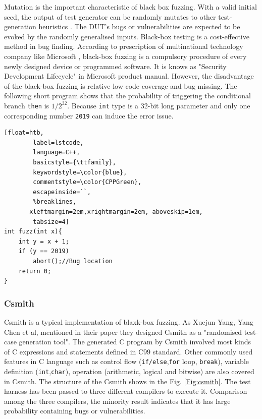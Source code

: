 Mutation is the important characteristic of black box fuzzing. With a valid initial seed, the output of test generator can be randomly mutates to other test-generation heuristics \cite{bounimova2013billions}. The DUT's bugs or vulnerabilities are expected to be evoked by the randomly generalised inputs. Black-box testing is a cost-effective method in bug finding. According to prescription of multinational technology company like Microsoft \cite{bounimova2013billions}, black-box fuzzing is a compulsory procedure of every newly designed device or programmed software. It is knows as "Security Development Lifecycle" \cite{howard2006security} in Microsoft product manual. However, the disadvantage of the black-box fuzzing is relative low code coverage and bug missing. The following short program shows that the probability of triggering the conditional branch \texttt{then} is $1/2^{32}$. Because \texttt{int} type is a 32-bit long parameter and only one corresponding number \texttt{2019} can induce the error issue.

\begin{lstlisting}[float=htb,
        label=lstcode,
        language=C++,
        basicstyle={\ttfamily},
        keywordstyle=\color{blue}, 
        commentstyle=\color{CPPGreen},
        escapeinside=``,
        %breaklines,
       xleftmargin=2em,xrightmargin=2em, aboveskip=1em,
        tabsize=4]
int fuzz(int x){
    int y = x + 1;
    if (y == 2019) 
        abort();//Bug location
    return 0;
}
\end{lstlisting}

\subsubsection{Csmith}
Csmith is a typical implementation of blaxk-box fuzzing. As Xuejun Yang, Yang Chen et al, mentioned in their paper \cite{Yang:2011:FUB:1993316.1993532} they designed Csmith as a "randomised test-case generation tool". The generated C program by Csmith involved most kinds of C expressions and statements defined in C99 standard. Other commonly used features in C language such as control flow (\texttt{if/else},\texttt{for} loop, \texttt{break}), variable definition (\texttt{int},\texttt{char}), operation (arithmetic, logical and bitwise) are also covered in Csmith. The structure of the Csmith shows in the Fig. \ref{Fig:csmith}. The test harness has been passed to three different compilers to execute it. Comparison among the three compilers, the minority result indicates that it has large probability containing bugs or vulnerabilities. 

